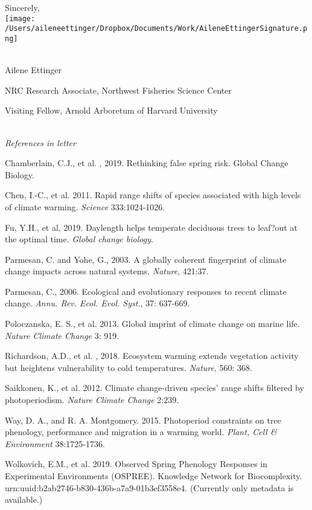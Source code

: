 \documentclass[10.7pt,a4paper]{letter} %
\begin{document}
\begin{letter}{}
Sincerely,\\
\texttt{[image: /Users/aileneettinger/Dropbox/Documents/Work/AileneEttingerSignature.png]} \\

\\
\begin{footnotesize}
Ailene Ettinger

NRC Research Associate, Northwest Fisheries Science Center

Visiting Fellow, Arnold Arboretum of Harvard University
\end{footnotesize}
\\
\noindent \emph{References in letter}
\begin{footnotesize}

\item Chamberlain, C.J., et al. , 2019. Rethinking false spring risk. Global Change Biology.

\item Chen, I.-C., et al. 2011. Rapid range shifts of species associated with high levels of climate warming.  \emph{Science} 333:1024-1026.
\item Fu, Y.H., et al, 2019. Daylength helps temperate deciduous trees to leaf?out at the optimal time. \emph{Global change biology}.

\item Parmesan, C. and Yohe, G., 2003. A globally coherent fingerprint of climate change impacts across natural systems.  \emph{Nature}, 421:37.

\item Parmesan, C., 2006. Ecological and evolutionary responses to recent climate change.  \emph{Annu. Rev. Ecol. Evol. Syst.}, 37: 637-669.

\item Poloczanska, E. S., et al. 2013. Global imprint of climate change on marine life. \emph{Nature Climate Change} 3: 919.

\item Richardson, A.D., et al. , 2018. Ecosystem warming extends vegetation activity but heightens vulnerability to cold temperatures. \emph{Nature}, 560: 368.

\item Saikkonen, K., et al. 2012. Climate change-driven species' range shifts filtered by photoperiodism. \emph{Nature Climate Change} 2:239.

\item Way, D. A., and R. A. Montgomery. 2015. Photoperiod constraints on tree phenology, performance and migration in a warming world. \emph{Plant, Cell \& Environment} 38:1725-1736.
\item Wolkovich, E.M.,  et al. 2019. Observed Spring Phenology Responses in Experimental Environments (OSPREE). Knowledge Network for Biocomplexity. urn:uuid:b2ab2746-b830-436b-a7a9-01b3ef3558e4. (Currently only metadata is available.)


\end{footnotesize}
\end{letter}
\end{document}
